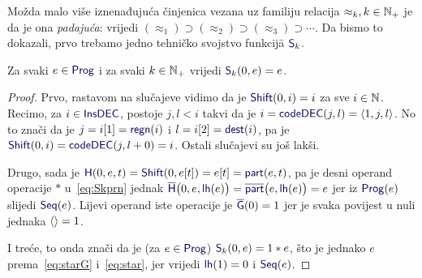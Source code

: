 Možda malo više iznenađujuća činjenica vezana uz familiju relacija $\approx_k,k\in{\mathbb N}_+$ je da je ona \emph{padajuća}: vrijedi $(\approx_1)\supset(\approx_2)\supset(\approx_3)\supset\dotsb$. Da bismo to dokazali, prvo trebamo jedno tehničko svojstvo funkcij\=a $\f S_k$.

\begin{lema}[{name=[nula je lijevi neutralni element za $\f S_k$]}]\label{lm:0nSk}
	Za svaki $e\in\f{Prog}$ i za svaki $k\in{\mathbb N}_+$ vrijedi $\f S_k(0,e)=e$.
\end{lema}
\begin{proof}

Prvo, rastavom na slučajeve vidimo da je $\f{Shift}(0,i)=i$ za sve $i\in{\mathbb N}$. Recimo, za $i\in\f{InsDEC}$, postoje $j,l<i$ takvi da je $i=\f{codeDEC}(j,l)=\kr{1,j,l}$. No to znači da je $j=i[1]=\f{regn}(i)$ i $l=i[2]=\f{dest}(i)$, pa je $\f{Shift}(0,i)=\f{codeDEC}(j,l+0)=i$. Ostali slučajevi su još lakši.

Drugo, sada je $\f H(0,e,t)=\f{Shift}(0,e[t])=e[t]=\f{part}(e,t)$, pa je desni operand operacije $*$ u~\eqref{eq:Skprn} jednak $\overline{\f H}\bigl(0,e,\f{lh}(e)\bigr)=\overline{\f{part}}\bigl(e,\f{lh}(e)\bigr)=e$ jer iz $\f{Prog}(e)$ slijedi $\f{Seq}(e)$. Lijevi operand iste operacije je $\overline{\f G}(0)=1$ jer je svaka povijest u nuli jednaka $\langle\rangle=1$.

I treće, to onda znači da je (za $e\in\f{Prog}$) $\f S_k(0,e)=1*e$, što je jednako $e$ prema~\eqref{eq:starG} i~\eqref{eq:star}, jer vrijedi $\f{lh}(1)=0$ i $\f{Seq}(e)$.
\end{proof}


